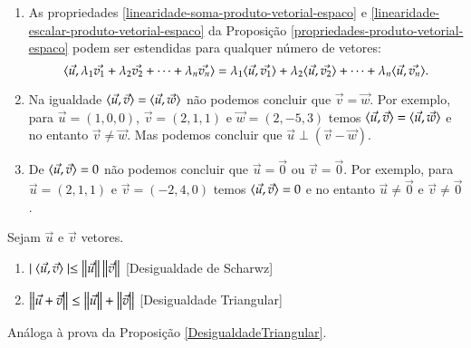 \begin{observacao}
  \begin{enumerate}[label=({\alph*})]
    \item As propriedades \ref{linearidade-soma-produto-vetorial-espaco} e \ref{linearidade-escalar-produto-vetorial-espaco} da Proposi\c{c}\~ao \ref{propriedades-produto-vetorial-espaco} podem ser estendidas para qualquer n\'umero de vetores:
    \[
      \langle\vec{u}, \lambda_1\vec{v_1} + \lambda_2\vec{v_2} + \cdots + \lambda_n\vec{v_n}\rangle = \lambda_1\langle \vec{u}, \vec{v_1} \rangle + \lambda_2\langle \vec{u}, \vec{v_2} \rangle + \cdots + \lambda_n\langle \vec{u}, \vec{v_n} \rangle.
    \]
    \item Na igualdade $\langle \vec{u}, \vec{v} \rangle = \langle \vec{u}, \vec{w} \rangle$ n\~ao podemos concluir que $\vec{v} = \vec{w}$. Por exemplo, para $\vec{u} = (1, 0, 0)$, $\vec{v} = (2, 1, 1)$ e $\vec{w} = (2, -5, 3)$ temos $\langle \vec{u}, \vec{v} \rangle = \langle \vec{u}, \vec{w} \rangle$ e no entanto $\vec{v} \ne \vec{w}$. Mas podemos concluir que $\vec{u}\perp(\vec{v} - \vec{w})$.
    \item De $\langle \vec{u}, \vec{v} \rangle = 0$ n\~ao podemos concluir que $\vec{u} = \vec{0}$ ou $\vec{v} = \vec{0}$. Por exemplo, para $\vec{u} = (2, 1, 1)$ e $\vec{v} = (-2, 4, 0)$ temos $\langle \vec{u}, \vec{v} \rangle = 0$ e no entanto $\vec{u} \ne \vec{0}$ e $\vec{v} \ne \vec{0}$.
  \end{enumerate}
\end{observacao}

\begin{proposicao}Sejam $\vec{u}$ e $\vec{v}$ vetores.
  \begin{enumerate}
    \item $\mid\langle \vec{u}, \vec{v} \rangle\mid \le \left\Vert{\vec{u}}\right\Vert\left\Vert{\vec{v}}\right\Vert$ [Desigualdade de Scharwz]
    \item $\left\Vert{\vec{u} + \vec{v}}\right\Vert \le \left\Vert{\vec{u}}\right\Vert + \left\Vert{\vec{v}}\right\Vert$ [Desigualdade Triangular]
  \end{enumerate}
\end{proposicao}
\begin{prova}
  An\'aloga \`a prova da Proposi\c{c}\~ao \ref{DesigualdadeTriangular}.
\end{prova}


